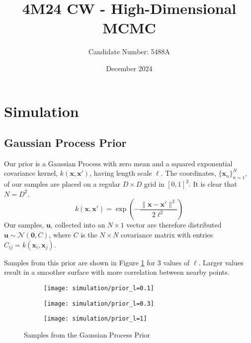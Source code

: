 \documentclass[11pt]{article}
\title{4M24 CW - High-Dimensional MCMC}
\author{Candidate Number: 5488A}
\date{December 2024}
\begin{document}
\maketitle

\section{Simulation}
\subsection{Gaussian Process Prior}
Our prior is a Gaussian Process with zero mean and a squared exponential covariance kernel, $k(\boldsymbol{x}, \boldsymbol{x}')$, having length scale $\ell$. The coordinates, $\{\boldsymbol{x}_n\}_{n=1}^{N}$, of our samples are placed on a regular $D \times D$ grid in $[0, 1]^2$. It is clear that $N = D^2$.
\begin{equation}
    k(\boldsymbol{x}, \boldsymbol{x}') = \exp\left(-\frac{\|\boldsymbol{x} - \boldsymbol{x}'\|^2}{2\ell^2}\right)
\end{equation}
Our samples, $\boldsymbol{u}$, collected into an $N \times 1$ vector are therefore distributed $\boldsymbol{u} \sim \mathcal{N}(\boldsymbol{0}, C)$, where $C$ is the $N \times N$ covariance matrix with entries $C_{ij} = k(\boldsymbol{x}_i, \boldsymbol{x}_j)$.

Samples from this prior are shown in Figure \ref{fig:gp_prior} for 3 values of $\ell$. Larger values result in a smoother surface with more correlation between nearby points.

\begin{figure}
    \centering
    \begin{subfigure}{0.3\textwidth}
        \texttt{[image: simulation/prior\_l=0.1]}
    \end{subfigure}
    \begin{subfigure}{0.3\textwidth}
        \texttt{[image: simulation/prior\_l=0.3]}
    \end{subfigure}
    \begin{subfigure}{0.3\textwidth}
        \texttt{[image: simulation/prior\_l=1]}
    \end{subfigure}
    \caption{Samples from the Gaussian Process Prior}
    \label{fig:gp_prior}
\end{figure}
\end{document}
